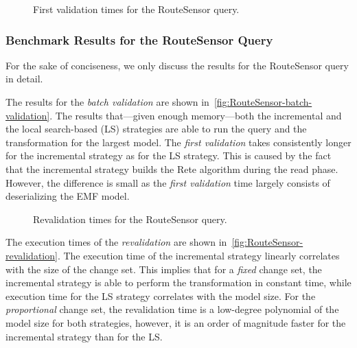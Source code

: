 \documentclass[submission,copyright,creativecommons]{eptcs}
\begin{document}
\begin{figure}
	\centering
	\caption{First validation times for the \textsf{RouteSensor} query.}
	\label{fig:RouteSensor-batch-validation}
\end{figure}

\subsubsection{Benchmark Results for the \textsf{RouteSensor} Query}

For the sake of conciseness, we only discuss the results for the \textsf{RouteSensor} query in detail. 

The results for the \emph{batch validation} are shown in~\autoref{fig:RouteSensor-batch-validation}. The results that---given enough memory---both the incremental and the local search-based (LS) strategies are able to run the query and the transformation for the largest model. The \emph{first validation} takes consistently longer for the incremental strategy as for the LS strategy. This is caused by the fact that the incremental strategy builds the Rete algorithm during the \textsf{read} phase. However, the difference is small as the \emph{first validation} time largely consists of deserializing the EMF model.

\begin{figure}
	\centering
	\caption{Revalidation times for the \textsf{RouteSensor} query.}
	\label{fig:RouteSensor-revalidation}
\end{figure}

The execution times of the \emph{revalidation} are shown in~\autoref{fig:RouteSensor-revalidation}. The execution time of the incremental strategy linearly correlates with the size of the change set. This implies that for a \emph{fixed} change set, the incremental strategy is able to perform the transformation in constant time, while execution time for the LS strategy correlates with the model size. For the \emph{proportional} change set, the revalidation time is a low-degree polynomial of the model size for both strategies, however, it is an order of magnitude faster for the incremental strategy than for the LS.
\end{document}
